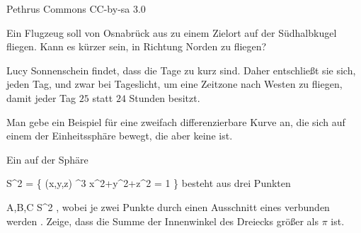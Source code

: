  {} {Pethrus} {Commons} {CC-by-sa 3.0} {}

{}
{

Ein Flugzeug soll von Osnabrück aus zu einem Zielort auf der Südhalbkugel fliegen. Kann es kürzer sein, in Richtung Norden zu fliegen?

}
{} {}

{}
{

Lucy Sonnenschein findet, dass die Tage zu kurz sind. Daher entschließt sie sich, jeden Tag, und zwar bei Tageslicht, um eine Zeitzone nach Westen zu fliegen, damit jeder Tag $25$ statt $24$ Stunden besitzt.

}
{} {}

{}
{

Man gebe ein Beispiel für eine zweifach differenzierbare Kurve an, die sich auf einem
der Einheitssphäre bewegt, die aber keine
ist.

}
{} {}

{}
{

Ein  {} auf der Sphäre

\mavergleichskettedisp
{\vergleichskette
{ S^2
}
{ =} { \left\{ (x,y,z) \in \R^3  \mid   x^2+y^2+z^2 = 1        \right\}
}
{ } {
}
{ } {
}
{ } {
}
}
{}{}{}
besteht aus drei Punkten

\mavergleichskette
{\vergleichskette
{ A,B,C
}
{ \in }{ S^2
}
{  }{
}
{    }{
}
{   }{
}
}
{}{}{,}
wobei je zwei Punkte durch einen Ausschnitt eines
verbunden werden
 {} {.}
Zeige, dass die Summe der Innenwinkel des Dreiecks größer als $\pi$ ist.

}
{} {}


